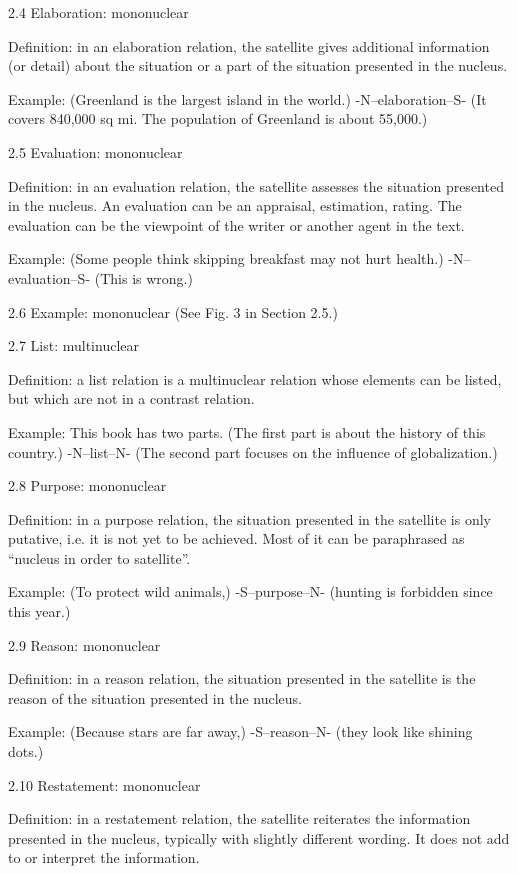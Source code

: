 \documentclass[english]{jnlp_1.3e}
\begin{document}
2.4 Elaboration: mononuclear

Definition: in an elaboration relation, the satellite gives additional information (or detail) about the situation or a part of the situation presented in the nucleus. 

Example: (Greenland is the largest island in the world.) -N--elaboration--S- (It covers 840,000 sq mi. The population of Greenland is about 55,000.)


2.5 Evaluation: mononuclear

Definition: in an evaluation relation, the satellite assesses the situation presented in the nucleus. An evaluation can be an appraisal, estimation, rating. The evaluation can be the viewpoint of the writer or another agent in the text. 

Example: (Some people think skipping breakfast may not hurt health.) -N--evaluation--S- (This is wrong.)


2.6 Example: mononuclear (See Fig. 3 in Section 2.5.)


2.7 List: multinuclear

Definition: a list relation is a multinuclear relation whose elements can be listed, but which are not in a contrast relation. 

Example: This book has two parts. (The first part is about the history of this country.) -N--list--N- (The second part focuses on the influence of globalization.)


2.8 Purpose: mononuclear

Definition: in a purpose relation, the situation presented in the satellite is only putative, i.e. it is not yet to be achieved. Most of it can be paraphrased as ``nucleus in order to satellite''. 

Example: (To protect wild animals,) -S--purpose--N- (hunting is forbidden since this year.)


2.9 Reason: mononuclear

Definition: in a reason relation, the situation presented in the satellite is the reason of the situation presented in the nucleus. 

Example: (Because stars are far away,) -S--reason--N- (they look like shining dots.)


2.10 Restatement: mononuclear

Definition: in a restatement relation, the satellite reiterates the information presented in the nucleus, typically with slightly different wording. It does not add to or interpret the information. 
\end{document}
